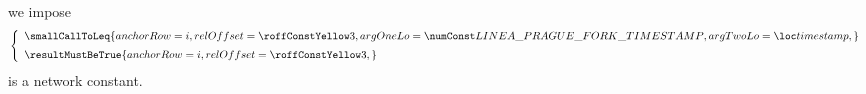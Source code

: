 \item[\underline{\underline{Comparing the timestamp to the \lineaPragueForkTimestamp{}:}}]
	we impose
	\[
		\left\{ \begin{array}{l}
			\smallCallToLeq {
				anchorRow = i                                       ,
				relOffset = \TNTFtimestampToForkTimestampComparison ,
				argOneLo  = \lineaPragueForkTimestamp               ,
				argTwoLo  = \locTimestamp                           ,
			}
			\vspace{2mm} \\
			\resultMustBeTrue {
				anchorRow = i                                       ,
				relOffset = \TNTFtimestampToForkTimestampComparison ,
			}
		\end{array} \right.
	\]
	\saNote{}
	\lineaPragueForkTimestamp{}
	is a network constant.
